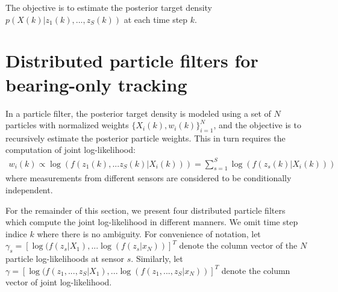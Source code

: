 \documentclass[10pt,letterpaper,final]{article}
\begin{document}
The objective is to estimate the posterior target density $p(X(k)|z_1(k),...,z_S(k))$ at each time step $k$. 


\section{Distributed particle filters for bearing-only tracking}
\label{sec:pf}
In a particle filter, the posterior target density is modeled using a set of $N$ particles with normalized weights $\{X_i(k), w_i(k)\}_{i=1}^N$, and the objective is to recursively estimate the posterior particle weights. This in turn requires the computation of joint log-likelihood:
\begin{align}
w_i(k) \propto \log(f(z_1(k),...z_S(k)|X_i(k))) = \sum_{s=1}^S \log(f(z_s(k)|X_i(k))) \label{eqn:log_lh_normal}
\end{align}
where measurements from different sensors are considered to be conditionally independent. 

For the remainder of this section, we present four distributed particle filters which compute the joint log-likelihood in different manners. We omit time step indice $k$ where there is no ambiguity. For convenience of notation, let $\gamma_s = [\log (f(z_s|X_1), ... \log (f(z_s|x_N))]^T$ denote the column vector of the $N$ particle log-likelihoods at sensor $s$. Similarly, let $\gamma = [\log (f(z_1, ..., z_S|X_1), ... \log (f(z_1, ..., z_S|x_N))]^T$ denote the column vector of joint log-likelihood. 
\end{document}
